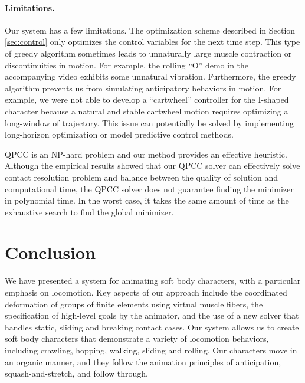 \paragraph{Limitations.} Our system has a few limitations.  The
optimization scheme described in Section \ref{sec:control} only
optimizes the control variables for the next time step. This type of
greedy algorithm sometimes leads to unnaturally large muscle contraction or
discontinuities in motion. For example, the rolling ``O'' demo in the accompanying
video exhibits some unnatural vibration. Furthermore, the greedy algorithm prevents us
from simulating anticipatory behaviors in motion. For example, we were
not able to develop a ``cartwheel'' controller for the I-shaped
character because a natural and stable cartwheel motion requires
optimizing a long-window of trajectory. This issue can potentially be
solved by implementing long-horizon optimization or model predictive
control methods.

QPCC is an NP-hard problem \cite{Braun:2005} and our method provides an effective heuristic.
Although the empirical results showed that our QPCC solver can
effectively solve contact resolution problem and balance between the
quality of solution and computational time, the QPCC solver does not
guarantee finding the minimizer in polynomial time. In the
worst case, it takes the same amount of time as the exhaustive search
to find the global minimizer.

\section{Conclusion}

We have presented a system for animating soft body characters, with a
particular emphasis on locomotion.  Key aspects of our approach include
the coordinated deformation of groups of finite elements using virtual
muscle fibers, the specification of high-level goals by the animator, and
the use of a new solver that handles static, sliding and breaking contact
cases.  Our system allows us to create soft body characters that
demonstrate a variety of locomotion behaviors, including crawling,
hopping, walking, sliding and rolling.  Our characters move in an organic
manner, and they follow the animation principles of anticipation,
squash-and-stretch, and follow through.

